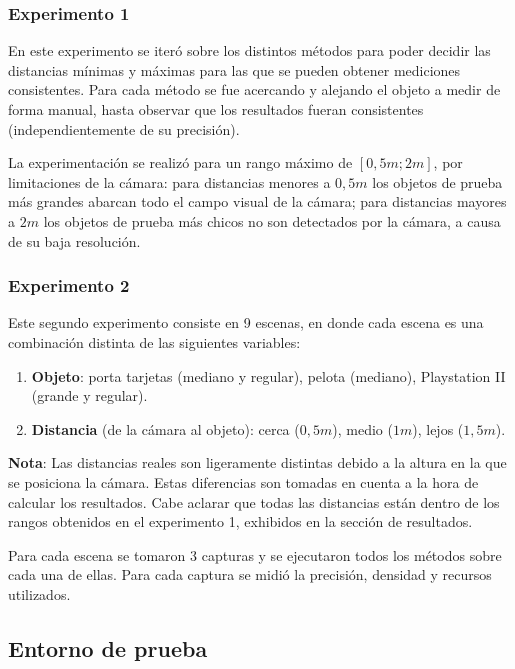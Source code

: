 \documentclass[11pt,a4paper,titlepage]{article}
\begin{document}
\subsubsection{Experimento 1}

En este experimento se iteró sobre los distintos métodos para poder decidir las distancias mínimas y máximas para las que se pueden obtener mediciones consistentes. Para cada método se fue acercando y alejando el objeto a medir de forma manual, hasta observar que los resultados fueran consistentes (independientemente de su precisión).

La experimentación se realizó para un rango máximo de $[0,5 m; 2 m]$, por limitaciones de la cámara: para distancias menores a $0,5 m$ los objetos de prueba más grandes abarcan todo el campo visual de la cámara; para distancias mayores a $2 m$ los objetos de prueba más chicos no son detectados por la cámara, a causa de su baja resolución.

\subsubsection{Experimento 2}

Este segundo experimento consiste en 9 escenas, en donde cada escena es una combinación distinta de las siguientes variables:
\begin{enumerate}
	\item \textbf{Objeto}: porta tarjetas (mediano y regular), pelota (mediano), Playstation II (grande y regular).
	\item \textbf{Distancia} (de la cámara al objeto): cerca ($0,5 m$), medio ($1 m$), lejos ($1,5 m$).
\end{enumerate}

\textbf{Nota}: Las distancias reales son ligeramente distintas debido a la altura en la que se posiciona la cámara. Estas diferencias son tomadas en cuenta a la hora de calcular los resultados. Cabe aclarar que todas las distancias están dentro de los rangos obtenidos en el experimento 1, exhibidos en la sección de resultados.

Para cada escena se tomaron 3 capturas y se ejecutaron todos los métodos sobre cada una de ellas. Para cada captura se midió la precisión, densidad y recursos utilizados.

\subsection{Entorno de prueba}
\end{document}
